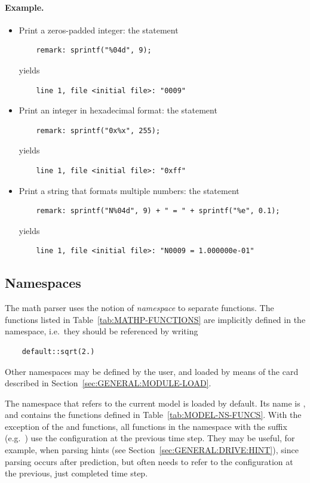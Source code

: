 \paragraph{Example.} 
\begin{itemize}
\item
Print a zeros-padded integer: the statement
\begin{verbatim}
    remark: sprintf("%04d", 9);
\end{verbatim}
yields
\begin{verbatim}
    line 1, file <initial file>: "0009"
\end{verbatim}

\item
Print an integer in hexadecimal format: the statement
\begin{verbatim}
    remark: sprintf("0x%x", 255);
\end{verbatim}
yields
\begin{verbatim}
    line 1, file <initial file>: "0xff"
\end{verbatim}

\item
Print a string that formats multiple numbers: the statement
\begin{verbatim}
    remark: sprintf("N%04d", 9) + " = " + sprintf("%e", 0.1);
\end{verbatim}
yields
\begin{verbatim}
    line 1, file <initial file>: "N0009 = 1.000000e-01"
\end{verbatim}
\end{itemize}





\subsection{Namespaces}
\label{sec:GENERAL:NAMESPACE}
The math parser uses the notion of \emph{namespace} to separate
functions.
The functions listed in Table~\ref{tab:MATHP-FUNCTIONS}
are implicitly defined in the  namespace, 
i.e.\ they should be referenced by writing
\begin{verbatim}
    default::sqrt(2.)
\end{verbatim}
Other namespaces may be defined by the user, and loaded by means
of the  card described
in Section~\ref{sec:GENERAL:MODULE-LOAD}.

The namespace that refers to the current model is loaded by default.
Its name is , and contains the functions 
defined in Table~\ref{tab:MODEL-NS-FUNCS}.
With the exception of the  and  functions,
all functions in the  namespace
with the suffix  (e.g.\ )
use the configuration at the previous time step.
They may be useful, for example, when parsing hints
(see Section~\ref{sec:GENERAL:DRIVE:HINT}),
since  parsing occurs after prediction,
but often needs to refer to the configuration
at the previous, just completed time step.

